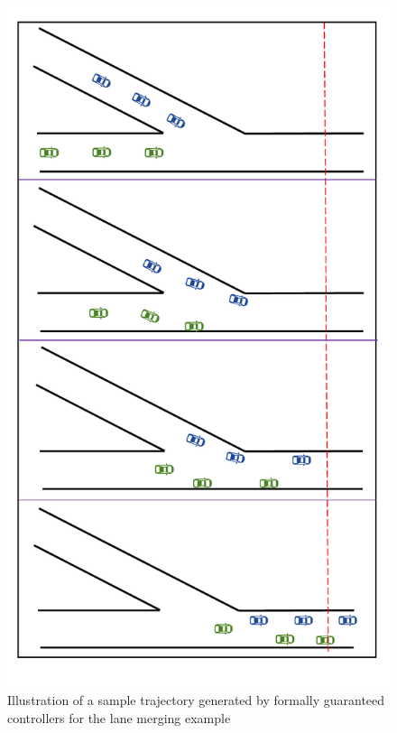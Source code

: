 \begin{figure}[t]
	\centering
	\includegraphics[scale=.21]{figures/merge.pdf}
	\caption{Illustration of a sample trajectory generated by formally guaranteed controllers for the lane merging example}
	\label{fig:merge}
\vspace*{-0.2cm}
\end{figure}


